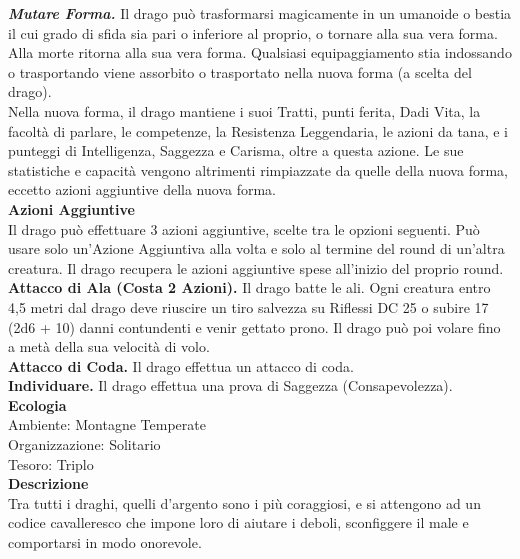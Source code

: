 \begin{multicols}{2}
\emph{\textbf{Mutare Forma.}} Il drago può trasformarsi magicamente in un umanoide o bestia il cui grado di sfida sia pari o inferiore al proprio,  o tornare alla sua vera forma. Alla morte ritorna alla sua vera forma.  Qualsiasi equipaggiamento stia indossando o trasportando viene  assorbito o trasportato nella nuova forma (a scelta del drago).  \\
Nella nuova forma, il drago mantiene i suoi Tratti, punti  ferita, Dadi Vita, la facoltà di parlare, le competenze, la Resistenza  Leggendaria, le azioni da tana, e i punteggi di Intelligenza, Saggezza  e Carisma, oltre a questa azione. Le sue statistiche e capacità  vengono altrimenti rimpiazzate da quelle della nuova forma, eccetto azioni aggiuntive della nuova forma.\\
\textbf{Azioni Aggiuntive}\\
Il drago può effettuare 3 azioni aggiuntive, scelte tra le opzioni  seguenti. Può usare solo un'Azione Aggiuntiva alla volta e solo  al termine del round di un'altra creatura. Il drago recupera le azioni aggiuntive spese all'inizio del proprio round.\\
\textbf{Attacco di Ala (Costa 2 Azioni).} Il drago batte le ali. Ogni creatura entro 4,5 metri dal drago deve riuscire un tiro salvezza su Riflessi DC 25 o subire 17 (2d6 + 10) danni contundenti e  venir gettato prono. Il drago può poi volare fino a metà della sua velocità di volo.\\
\textbf{Attacco di Coda.} Il drago effettua un attacco di coda.\\
\textbf{Individuare.} Il drago effettua una prova di Saggezza (Consapevolezza).\\
\textbf{Ecologia}\\
Ambiente: Montagne Temperate\\
Organizzazione: Solitario\\
Tesoro: Triplo\\
\textbf{Descrizione}\\
Tra tutti i draghi, quelli d’argento sono i più coraggiosi, e si attengono ad un codice cavalleresco che impone loro di aiutare i deboli, sconfiggere il male e comportarsi in modo onorevole.\\


\end{multicols}

